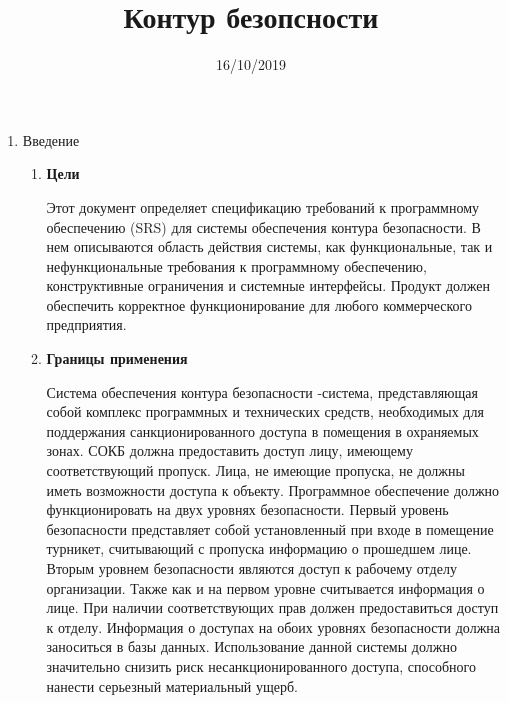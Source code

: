 \documentclass[12pt]{article} %
\title{Контур безопсности} %
\date{16/10/2019} %
\begin{document}
 \maketitle

   \begin{enumerate}

  \item Введение
    \begin{enumerate} 
        \item \begin{large} \textbf{Цели} \end{large} \newline
          Этот документ определяет спецификацию требований к программному обеспечению (SRS) для системы обеспечения контура безопасности. В нем описываются область действия системы, как функциональные, так и нефункциональные требования к программному обеспечению, конструктивные ограничения и системные интерфейсы.
          Продукт должен обеспечить корректное функционирование для любого коммерческого предприятия.

        \item \begin{large} \textbf{Границы применения} \end{large} \newline
        Система обеспечения контура безопасности -система, представляющая собой комплекс программных и технических средств, необходимых для поддержания санкционированного доступа в помещения в охраняемых зонах.
        СОКБ должна предоставить доступ лицу, имеющему соответствующий пропуск. Лица, не имеющие пропуска, не должны иметь возможности доступа к объекту.  
        Программное обеспечение должно функционировать на двух уровнях безопасности. Первый уровень безопасности представляет собой установленный при входе в помещение турникет, считывающий с пропуска информацию о прошедшем лице. Вторым уровнем безопасности являются доступ к рабочему отделу организации. Также как и на первом уровне считывается информация о лице. При наличии соответствующих прав должен предоставиться доступ к отделу. Информация о доступах на обоих уровнях безопасности должна заноситься в базы данных. 
        Использование данной системы должно значительно снизить риск несанкционированного доступа, способного нанести серьезный материальный ущерб. 
        

\end{enumerate}
\end{enumerate}
\end{document}
